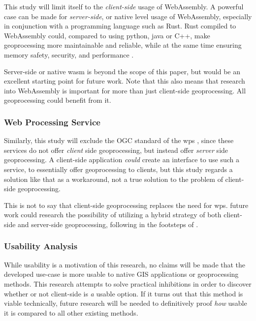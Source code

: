 This study will limit itself to the \emph{client-side} usage of WebAssembly. 
A powerful case can be made for \emph{server-side}, or native level usage of WebAssembly, especially in conjunction with a programming language such as Rust. 
Rust compiled to WebAssembly could, compared to using python, java or C++, make geoprocessing more maintainable and reliable, while at the same time ensuring memory safety, security, and performance \cite{clack_standardizing_2019}. 

Server-side or native wasm is beyond the scope of this paper, but would be an excellent starting point for future work. Note that this also means that research into WebAssembly is important for more than just client-side geoprocessing. All geoprocessing could benefit from it.



\subsubsection*{ Web Processing Service } %

Similarly, this study will exclude the OGC standard of the \ac{wps} \cite{ogc_web_2015}, since these services do not offer \emph{client} side geoprocessing, but instead offer \emph{server} side geoprocessing. A client-side application \textit{could} create an interface to use such a service, to essentially offer geoprocessing to clients, but this study regards a solution like that as a workaround, not a true solution to the problem of client-side geoprocessing. 

This is not to say that client-side geoprocessing replaces the need for \ac{wps}. 
future work could research the possibility of utilizing a hybrid strategy of both client-side and server-side geoprocessing, following in the footsteps of \cite{panidi_hybrid_2015}. 



\subsubsection*{ Usability Analysis } %

While usability is a motivation of this research, no claims will be made that the developed use-case is more usable to native GIS applications or geoprocessing methods. This research attempts to solve practical inhibitions in order to discover whether or not client-side is \emph{a} usable option. If it turns out that this method is viable technically, future research will be needed to definitively proof \emph{how} usable it is compared to all other existing methods.  


